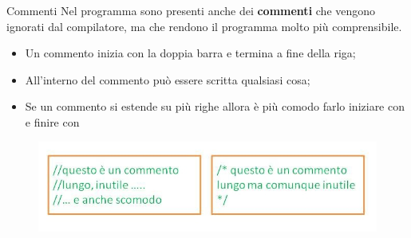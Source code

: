 \begin{frame}
\begin{block}{Commenti}
Nel programma sono presenti anche dei \textbf{commenti} che vengono \alert{ignorati} dal compilatore, ma che rendono
il programma molto più comprensibile.
\end{block}
\begin{block}{}
\begin{itemize}
\item Un commento inizia con la doppia barra \textCl{//} e termina a fine della riga;
\item All'interno del commento può essere scritta qualsiasi cosa; 
\item Se un commento si estende su più righe allora è più comodo farlo iniziare con \textCl{/*} e finire con \textCl{*/}
\end{itemize}
\end{block}
\begin{figure}
\begin{center}
\includegraphics[scale=0.5]{images/commento.jpg}
\end{center}
\end{figure}
\end{frame}

